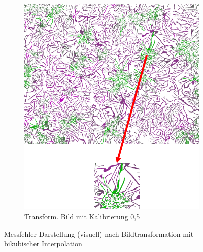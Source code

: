 \documentclass[
fontsize=10pt, 
listof = totoc,
parskip = half	
]{report}
\begin{document}
\begin{figure}[h]
\begin{subfigure}{0.33\textwidth}
	\end{subfigure}\hfill
	\begin{subfigure}{0.33\textwidth}
		\centering
		\includegraphics[scale=0.5]{pics/ClassificationCalib05.png}
		\caption{Transform. Bild mit Kalibrierung 0,5}
	\end{subfigure}
	\caption{Messfehler-Darstellung (visuell) nach Bildtransformation mit bikubischer Interpolation}
	\label{fig:KlassErrorVisuell}
\end{figure}
\end{document}
